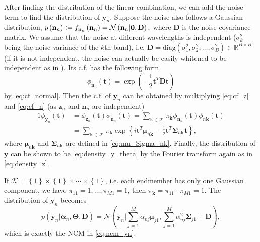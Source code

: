 \documentclass[twocolumn,english]{IEEEtran}
\theoremstyle{plain}
\begin{document}
After finding the distribution of the linear combination, we can add
the noise term to find the distribution of $\mathbf{y}_{n}$. Suppose
the noise also follows a Gaussian distribution, $p\left(\mathbf{n}_{n}\right)\vcentcolon=f_{\mathbf{n}_{n}}\left(\mathbf{n}_{n}\right)=\mathcal{N}\left(\mathbf{n}_{n}\vert\mathbf{0},\mathbf{D}\right),$
where $\mathbf{D}$ is the noise covariance matrix. We assume that
the noise at different wavelengths is independent ($\sigma_{k}^{2}$
being the noise variance of the $k$th band), i.e. $\mathbf{D}=\text{diag}\left(\sigma_{1}^{2},\sigma_{2}^{2},\dots,\sigma_{B}^{2}\right)\in\mathbb{R}^{B\times B}$
(if it is not independent, the noise can actually be easily whitened
to be independent as in \cite{lee1990enhancement}). Its c.f. has
the following form 
\begin{equation}
\phi_{\mathbf{n}_{n}}\left(\mathbf{t}\right)=\exp\left(-\frac{1}{2}\mathbf{t}^{T}\mathbf{D}\mathbf{t}\right)\label{eq:cf_n}
\end{equation}
by \eqref{eq:cf_normal}. Then the c.f. of $\mathbf{y}_{n}$ can be
obtained by multiplying \eqref{eq:cf_z} and \eqref{eq:cf_n} (as
$\mathbf{z}_{n}$ and $\mathbf{n}_{n}$ are independent)
\begin{alignat*}{1}
\phi_{\mathbf{y}_{n}}\left(\mathbf{t}\right) & =\phi_{\mathbf{z}_{n}}\left(\mathbf{t}\right)\phi_{\mathbf{n}_{n}}\left(\mathbf{t}\right)=\sum_{\mathbf{k}\in\mathcal{K}}\pi_{\mathbf{k}}\phi_{\mathbf{n}_{n}}\left(\mathbf{t}\right)\phi_{n\mathbf{k}}\left(\mathbf{t}\right)\\
 & =\sum_{\mathbf{k}\in\mathcal{K}}\pi_{\mathbf{k}}\exp\left\{ i\mathbf{t}^{T}\boldsymbol{\mu}_{n\mathbf{k}}-\frac{1}{2}\mathbf{t}^{T}\boldsymbol{\Sigma}_{n\mathbf{k}}\mathbf{t}\right\} ,
\end{alignat*}
where $\boldsymbol{\mu}_{n\mathbf{k}}$ and $\boldsymbol{\Sigma}_{n\mathbf{k}}$
are defined in \eqref{eq:mu_Sigma_nk}. Finally, the distribution
of $\mathbf{y}$ can be shown to be \eqref{eq:density_y_theta} by
the Fourier transform again as in \eqref{eq:density_z}.

If $\mathcal{K}=\left\{ 1\right\} \times\left\{ 1\right\} \times\cdots\times\left\{ 1\right\} $,
i.e. each endmember has only one Gaussian component, we have $\pi_{11}=1,\dots,\pi_{M1}=1$,
then $\pi_{\mathbf{k}}=\pi_{11}\cdots\pi_{M1}=1$. The distribution
of $\mathbf{y}_{n}$ becomes
\begin{equation}
p\left(\mathbf{y}_{n}\vert\boldsymbol{\alpha}_{n},\boldsymbol{\Theta},\mathbf{D}\right)=\mathcal{N}\left(\mathbf{y}_{n}\vert\sum_{j=1}^{M}\alpha_{nj}\boldsymbol{\mu}_{j1},\sum_{j=1}^{M}\alpha_{nj}^{2}\boldsymbol{\Sigma}_{j1}+\mathbf{D}\right),\label{eq:density_y_single}
\end{equation}
which is exactly the NCM in \eqref{eq:ncm_yn}.
\end{document}
